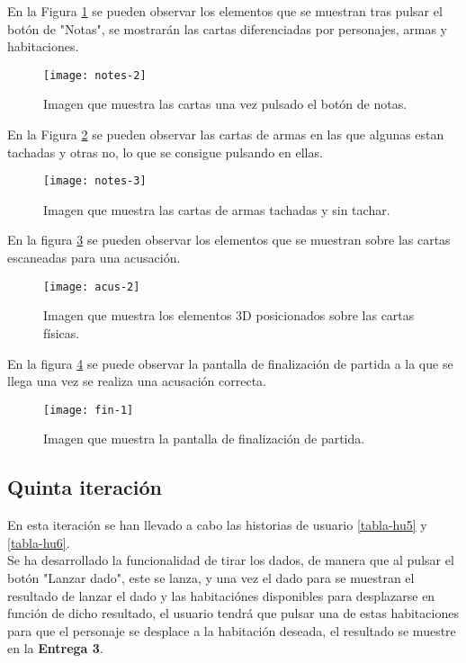 \begin{itemize}
\newpage

En la Figura \ref{figura-notas-1} se pueden observar los elementos que se muestran tras pulsar el botón de "Notas", se mostrarán las cartas diferenciadas por personajes, armas y habitaciones.

\begin{figure}[h]
  \centering
  \texttt{[image: notes-2]}
  \caption{Imagen que muestra las cartas una vez pulsado el botón de notas.}
  \label{figura-notas-1}
\end{figure}

En la Figura \ref{figura-notas-2} se pueden observar las cartas de armas en las que algunas estan tachadas y otras no, lo que se consigue pulsando en ellas.

\begin{figure}[h]
  \centering
  \texttt{[image: notes-3]}
  \caption{Imagen que muestra las cartas de armas tachadas y sin tachar.}
  \label{figura-notas-2}
\end{figure}

\newpage

En la figura \ref{figura-acus-1} se pueden observar los elementos que se muestran sobre las cartas escaneadas para una acusación.

\begin{figure}[h]
  \centering
  \texttt{[image: acus-2]}
  \caption{Imagen que muestra los elementos 3D posicionados sobre las cartas físicas.}
  \label{figura-acus-1}
\end{figure}

En la figura \ref{figura-fin-1} se puede observar la pantalla de finalización de partida a la que se llega una vez se realiza una acusación correcta.

\begin{figure}[h]
  \centering
  \texttt{[image: fin-1]}
  \caption{Imagen que muestra la pantalla de finalización de partida.}
  \label{figura-fin-1}
\end{figure}

\subsection{Quinta iteración}
En esta iteración se han llevado a cabo las historias de usuario \ref{tabla-hu5} y \ref{tabla-hu6}.\\

Se ha desarrollado la funcionalidad de tirar los dados, de manera que al pulsar el botón "Lanzar dado", este se lanza, y una vez el dado para se muestran el resultado de lanzar el dado y las habitaciónes disponibles para desplazarse en función de dicho resultado, el usuario tendrá que pulsar una de estas habitaciones para que el personaje se desplace a la habitación deseada, el resultado se muestre en la \textbf{Entrega 3}.\\


\end{itemize}
